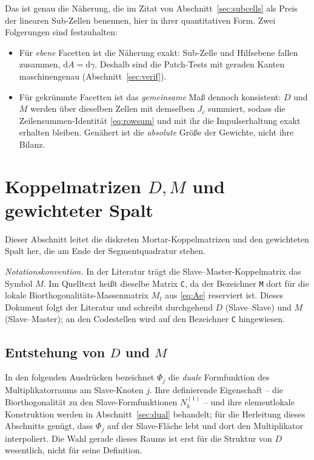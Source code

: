 \documentclass[a4paper,11pt]{article}
\def\bm#1{#1}%
\newcommand{\code}[1]{\texttt{\small #1}}
\let\stdsection\section
\renewcommand{\section}{\clearpage\stdsection}
\begin{document}
Das ist genau die Näherung, die \citet{puso2008} im Zitat von Abschnitt~\ref{sec:subcells} als
Preis der linearen Sub-Zellen benennen, hier in ihrer quantitativen Form. Zwei Folgerungen sind
festzuhalten:
\begin{itemize}\itemsep2pt
  \item Für \emph{ebene} Facetten ist die Näherung exakt: Sub-Zelle und Hilfsebene fallen zusammen,
        $\mathrm dA=\mathrm d\gamma$. Deshalb sind die Patch-Tests mit geraden Kanten
        maschinengenau (Abschnitt~\ref{sec:verif}).
  \item Für gekrümmte Facetten ist das \emph{gemeinsame} Maß dennoch konsistent: $\bm D$ und
        $\bm M$ werden über dieselben Zellen mit demselben $J_c$ summiert, sodass die
        Zeilensummen-Identität \eqref{eq:rowsum} und mit ihr die Impulserhaltung exakt erhalten
        bleiben. Genähert ist die \emph{absolute} Größe der Gewichte, nicht ihre Bilanz.
\end{itemize}

\section{Koppelmatrizen $\bm D,\bm M$ und gewichteter Spalt}
\label{sec:koppelmatrizen}

Dieser Abschnitt leitet die diskreten Mortar-Koppelmatrizen und den gewichteten Spalt her, die am
Ende der Segmentquadratur stehen.

\medskip
\noindent\emph{Notationskonvention.} In der Literatur trägt die Slave--Master-Koppelmatrix das
Symbol $\bm M$. Im Quelltext heißt dieselbe Matrix \code{C}, da der Bezeichner \code{M} dort für die
lokale Biorthogonalitäts-Massenmatrix $\bm M_t$ aus \eqref{eq:Ae} reserviert ist. Dieses Dokument
folgt der Literatur und schreibt durchgehend $\bm D$ (Slave--Slave) und $\bm M$ (Slave--Master); an
den Codestellen wird auf den Bezeichner \code{C} hingewiesen.

\subsection{Entstehung von $\bm D$ und $\bm M$}
In den folgenden Ausdrücken bezeichnet $\Phi_j$ die \emph{duale} Formfunktion des
Multiplikatorraums am Slave-Knoten $j$. Ihre definierende Eigenschaft -- die Biorthogonalität zu
den Slave-Formfunktionen $N_k^{(1)}$ -- und ihre elementlokale Konstruktion werden in
Abschnitt~\ref{sec:dual} behandelt; für die Herleitung dieses Abschnitts genügt, dass $\Phi_j$ auf
der Slave-Fläche lebt und dort den Multiplikator interpoliert. Die Wahl gerade dieses Raums ist
erst für die Struktur von $\bm D$ wesentlich, nicht für seine Definition.
\end{document}

